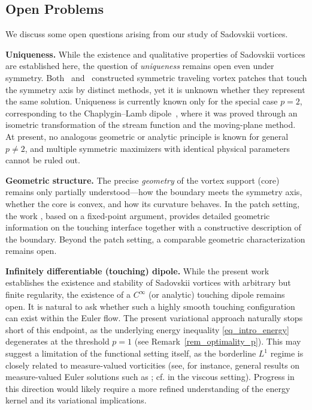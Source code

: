 \documentclass[11pt]{amsart}
\theoremstyle{definition}
\theoremstyle{definition}
\numberwithin{equation}{section}
\newcommand{\0}{\emptyset}
\begin{document}
	
	\subsection{Open Problems}\label{sec: open problem}
	
	We discuss some open questions arising from our study of Sadovskii vortices.
	
	\medskip
	
	
	\noindent\textbf{Uniqueness.}
	While the existence and qualitative properties of Sadovskii vortices are established here, the question of \emph{uniqueness} remains open even under symmetry.
	Both~\cite{CJS2025} and~\cite{HT2025} constructed symmetric traveling vortex patches that touch the symmetry axis by distinct methods, yet it is unknown whether they represent the same solution.
	Uniqueness is currently known only for the special case $p=2$, corresponding to the Chaplygin--Lamb dipole~\cite{Bur1996, Bur2005}, where it was proved through an isometric transformation of the stream function and the moving-plane method.
	At present, no analogous geometric or analytic principle is known for general $p\ne 2$, and multiple symmetric maximizers with identical physical parameters cannot be ruled out.
	
	\medskip
	
    \noindent\textbf{Geometric structure.}
    The precise \emph{geometry} of the vortex support (core) remains only partially understood—how the boundary meets the symmetry axis, whether the core is convex, and how its curvature behaves. In the patch setting, the work \cite{HT2025}, based on a fixed-point argument, provides detailed geometric information on the touching interface together with a constructive description of the boundary.  Beyond the patch setting, a comparable geometric characterization remains open.
    
		\medskip
	
    \noindent\textbf{Infinitely differentiable (touching) dipole.}  
    While the present work establishes the existence and stability of Sadovskii vortices with arbitrary but finite regularity, the existence of a $C^{\infty}$ (or analytic) touching dipole remains open. It is natural to ask whether such a highly smooth touching configuration can exist within the Euler flow. The present variational approach naturally stops short of this endpoint, as the underlying energy inequality \eqref{eq_intro_energy} degenerates at the threshold $p=1$ (see Remark~\ref{rem_optimality_p}).  This may suggest a limitation of the functional setting itself, as the borderline $L^1$ regime is closely related to   measure-valued vorticities (see, for instance, general results on measure-valued Euler solutions such as \cite{Delort}; cf. \cite{GallagherGallay, Abe21_measure} in the viscous setting). Progress in this direction would likely require a more refined understanding of the energy kernel and its variational implications.
\end{document}
